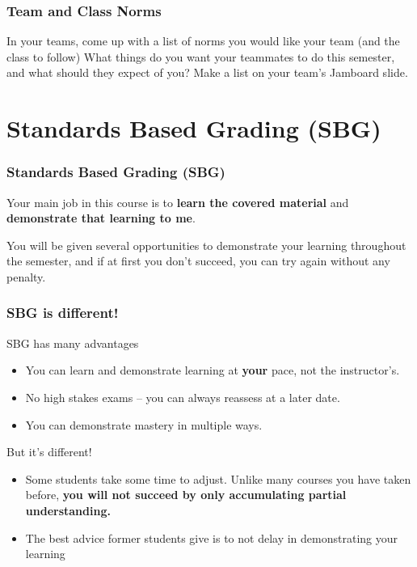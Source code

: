 \documentclass[aspectration=1610]{beamer}
\begin{document}
\begin{frame}\frametitle{Team and Class Norms}

In your teams, come up with a list of norms you would like your team (and the class to follow)
\vfill
What things do you want your teammates to do this semester, and what should they expect of you?
\vfill
Make a list on your team's Jamboard slide.
\end{frame}

\section{Standards Based Grading (SBG)}
%
%



\begin{frame}\frametitle{Standards Based Grading (SBG)}
Your main job in this course is to \textbf{learn the covered material}
and \textbf{demonstrate that learning to me}.

\vspace{0.2in}
\pause

You will be given several opportunities to demonstrate your learning throughout
the semester, and if
at first you don't succeed, you can try again without any penalty.
\end{frame}

\begin{frame}\frametitle{SBG is different!}
SBG has many advantages
\begin{itemize}
\item You can learn and demonstrate learning at \textbf{your} pace, not the instructor's.
\item No high stakes exams -- you can always reassess at a later date.
\item You can demonstrate mastery in multiple ways.
\end{itemize}
\vfill
But it's different!
\begin{itemize}
\item Some students take some time to adjust.  Unlike many courses you have taken before, \textbf{you will not succeed by only accumulating partial understanding.}
\item The best advice former students give is to not delay in demonstrating your learning
\end{itemize}
\end{frame}
\end{document}
